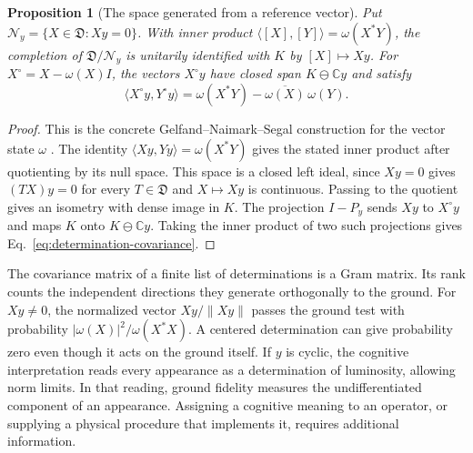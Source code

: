 \documentclass[11pt]{article}
\newtheorem{proposition}{Proposition}[section]
\theoremstyle{definition}
\newcommand{\C}{\mathbb C}
\begin{document}
\begin{proposition}[The space generated from a reference vector]
\label{prop:cyclic-determination-content}
Put $\mathcal N_y=\{X\in\mathfrak D:Xy=0\}$. With inner product $\langle[X],[Y]\rangle=\omega(X^*Y)$, the completion of $\mathfrak D/\mathcal N_y$ is unitarily identified with $K$ by $[X]\mapsto Xy$. For $X^\circ=X-\omega(X)I$, the vectors $X^\circ y$ have closed span $K\ominus\C y$ and satisfy
\begin{equation}
 \langle X^\circ y,Y^\circ y\rangle
 =\omega(X^*Y)-\overline{\omega(X)}\,\omega(Y).
 \label{eq:determination-covariance}
\end{equation}
\end{proposition}
\begin{proof}
This is the concrete Gelfand--Naimark--Segal construction for the vector state $\omega$ \cite{BratteliRobinson}. The identity $\langle Xy,Yy\rangle=\omega(X^*Y)$ gives the stated inner product after quotienting by its null space. This space is a closed left ideal, since $Xy=0$ gives $(TX)y=0$ for every $T\in\mathfrak D$ and $X\mapsto Xy$ is continuous. Passing to the quotient gives an isometry with dense image in $K$. The projection $I-P_y$ sends $Xy$ to $X^\circ y$ and maps $K$ onto $K\ominus\C y$. Taking the inner product of two such projections gives Eq.~\eqref{eq:determination-covariance}.
\end{proof}

The covariance matrix of a finite list of determinations is a Gram matrix. Its rank counts the independent directions they generate orthogonally to the ground. For $Xy\ne0$, the normalized vector $Xy/\|Xy\|$ passes the ground test with probability $|\omega(X)|^2/\omega(X^*X)$. A centered determination can give probability zero even though it acts on the ground itself. If $y$ is cyclic, the cognitive interpretation reads every appearance as a determination of luminosity, allowing norm limits. In that reading, ground fidelity measures the undifferentiated component of an appearance. Assigning a cognitive meaning to an operator, or supplying a physical procedure that implements it, requires additional information.
\end{document}
